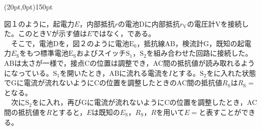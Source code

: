 \hakosyokika
\item
    \begin{mawarikomi}(20pt,0pt){150pt}{
        
        
    }
        図１のように，起電力$E$，内部抵抗$r$\tanni{\Omega }の電池Dに内部抵抗$r_\mathrm{V}$\tanni{\Omega }の電圧計Vを接続した。このときVが示す値は$E$ではなく，\Hako {}である。\\
        ~~そこで，電池Dを，図２のように電池$\mathrm{E_0}$，抵抗線AB，検流計G，既知の起電力$E_\mathrm{S}$をもつ標準電池$\mathrm{E_S}$およびスイッチ$\mathrm{S_1}$，$\mathrm{S_2}$を組み合わせた回路に接続した。ABは太さが一様で，接点Cの位置は調整でき，AC間の抵抗値が読み取れるようになっている。$\mathrm{S_1}$を開いたとき，ABに流れる電流を$I$とする。$\mathrm{S_2}$をに入れた状態でGに電流が流れないようにCの位置を調整したときのAC間の抵抗値$R_\mathrm{S}$は$R_\mathrm{S}=$\Hako \tanni{\Omega }となる。\\
        ~~次に$\mathrm{S_2}$をに入れ，再びGに電流が流れないようにCの位置を調整したとき，AC間の抵抗値を$R$\tanni{\Omega }とすると，$E$は既知の$E_\mathrm{S}$，$R_\mathrm{S}$，$R$を用いて$E=$\Hako {}と表すことができる。 
    \end{mawarikomi}